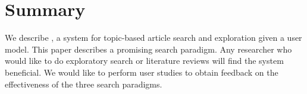 
\section{Summary}

We describe \system, a system for topic-based article search
and exploration given a user model.
This paper describes a promising search paradigm.
Any researcher who would like to do exploratory search or literature 
reviews will find the system beneficial.
We would like to perform user studies to obtain feedback on the 
effectiveness of the three search paradigms.

